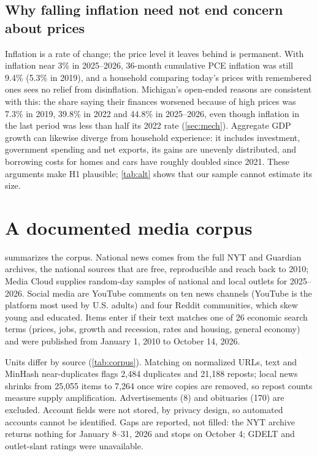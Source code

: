 \documentclass[11pt]{article}
\begin{document}
\subsection{Why falling inflation need not end concern about prices}
Inflation is a rate of change; the price level it leaves behind is permanent. With inflation near 3\% in 2025–2026, 36-month cumulative PCE inflation was still 9.4\% (5.3\% in 2019), and a household comparing today's prices with remembered ones sees no relief from disinflation. Michigan's open-ended reasons are consistent with this: the share saying their finances worsened because of high prices was 7.3\% in 2019, 39.8\% in 2022 and 44.8\% in 2025–2026, even though inflation in the last period was less than half its 2022 rate (\cref{sec:mech}). Aggregate GDP growth can likewise diverge from household experience: it includes investment, government spending and net exports, its gains are unevenly distributed, and borrowing costs for homes and cars have roughly doubled since 2021. These arguments make H1 plausible; \cref{tab:alt} shows that our sample cannot estimate its size.

\section{A documented media corpus}\label{sec:corpus}

  summarizes the corpus. National news comes from the full NYT and Guardian archives, the national sources that are free, reproducible and reach back to 2010; Media Cloud supplies random-day samples of national and local outlets for 2025–2026. Social media are YouTube comments on ten news channels (YouTube is the platform most used by U.S. adults) and four Reddit communities, which skew young and educated. Items enter if their text matches one of 26 economic search terms (prices, jobs, growth and recession, rates and housing, general economy) and were published from January 1, 2010 to October 14, 2026.

 Units differ by source (\cref{tab:corpus}). Matching on normalized URLs, text and MinHash near-duplicates flags 2,484 duplicates and 21,188 reposts; local news shrinks from 25,055 items to 7,264 once wire copies are removed, so repost counts measure supply amplification. Advertisements (8) and obituaries (170) are excluded. Account fields were not stored, by privacy design, so automated accounts cannot be identified. Gaps are reported, not filled: the NYT archive returns nothing for January 8–31, 2026 and stops on October 4; GDELT and outlet-slant ratings were unavailable.
\end{document}
